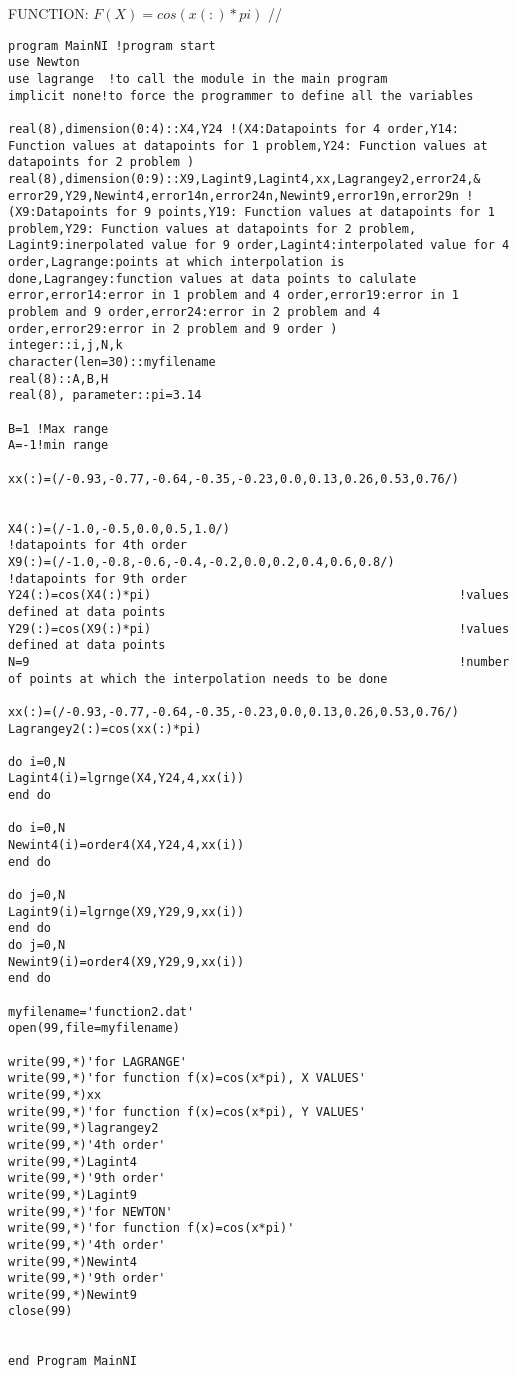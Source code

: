 \documentclass[10pt,a4paper]{article}
\begin{document}
FUNCTION: $F(X)=cos(x(:)*pi)$ //	
\begin{lstlisting}	
program MainNI !program start
use Newton
use lagrange  !to call the module in the main program
implicit none!to force the programmer to define all the variables

real(8),dimension(0:4)::X4,Y24 !(X4:Datapoints for 4 order,Y14: Function values at datapoints for 1 problem,Y24: Function values at datapoints for 2 problem )
real(8),dimension(0:9)::X9,Lagint9,Lagint4,xx,Lagrangey2,error24,&
error29,Y29,Newint4,error14n,error24n,Newint9,error19n,error29n !(X9:Datapoints for 9 points,Y19: Function values at datapoints for 1 problem,Y29: Function values at datapoints for 2 problem, Lagint9:inerpolated value for 9 order,Lagint4:interpolated value for 4 order,Lagrange:points at which interpolation is done,Lagrangey:function values at data points to calulate error,error14:error in 1 problem and 4 order,error19:error in 1 problem and 9 order,error24:error in 2 problem and 4 order,error29:error in 2 problem and 9 order )
integer::i,j,N,k
character(len=30)::myfilename
real(8)::A,B,H
real(8), parameter::pi=3.14

B=1 !Max range
A=-1!min range

xx(:)=(/-0.93,-0.77,-0.64,-0.35,-0.23,0.0,0.13,0.26,0.53,0.76/)


X4(:)=(/-1.0,-0.5,0.0,0.5,1.0/)                                !datapoints for 4th order
X9(:)=(/-1.0,-0.8,-0.6,-0.4,-0.2,0.0,0.2,0.4,0.6,0.8/)         !datapoints for 9th order
Y24(:)=cos(X4(:)*pi)                                           !values defined at data points
Y29(:)=cos(X9(:)*pi)                                           !values defined at data points
N=9                                                            !number of points at which the interpolation needs to be done

xx(:)=(/-0.93,-0.77,-0.64,-0.35,-0.23,0.0,0.13,0.26,0.53,0.76/)
Lagrangey2(:)=cos(xx(:)*pi) 

do i=0,N
Lagint4(i)=lgrnge(X4,Y24,4,xx(i))
end do

do i=0,N
Newint4(i)=order4(X4,Y24,4,xx(i))
end do

do j=0,N
Lagint9(i)=lgrnge(X9,Y29,9,xx(i))
end do
do j=0,N
Newint9(i)=order4(X9,Y29,9,xx(i))
end do

myfilename='function2.dat'
open(99,file=myfilename)

write(99,*)'for LAGRANGE'
write(99,*)'for function f(x)=cos(x*pi), X VALUES'
write(99,*)xx
write(99,*)'for function f(x)=cos(x*pi), Y VALUES'
write(99,*)lagrangey2
write(99,*)'4th order'
write(99,*)Lagint4
write(99,*)'9th order'
write(99,*)Lagint9
write(99,*)'for NEWTON'
write(99,*)'for function f(x)=cos(x*pi)'
write(99,*)'4th order'
write(99,*)Newint4
write(99,*)'9th order'
write(99,*)Newint9
close(99)


end Program MainNI

	\end{lstlisting}
\end{document}
